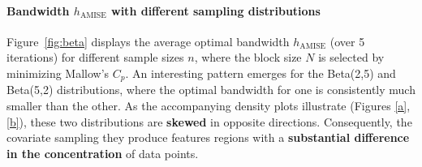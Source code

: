 \documentclass{article}
\begin{document}
\paragraph{Bandwidth $h_{\text{AMISE}}$ with different sampling distributions}
Figure~\ref{fig:beta} displays the average optimal bandwidth $h_{\text{AMISE}}$ (over 5 iterations) for different sample sizes $n$, where the block size $N$ is selected by minimizing Mallow's $C_p$. 
An interesting pattern emerges for the Beta(2,5) and Beta(5,2) distributions, where the optimal bandwidth for one is consistently much smaller than the other. As the accompanying density plots illustrate (Figures \ref{a}, \ref{b}), 
these two distributions are \textbf{skewed} in opposite directions. Consequently, the covariate sampling they produce features regions with a \textbf{substantial difference in the concentration} of data points.
\end{document}

